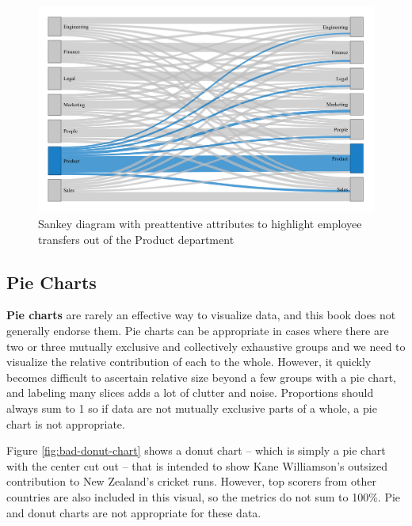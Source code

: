 \documentclass[
]{book}
\begin{document}
\begin{figure}

{\centering \includegraphics[width=1\linewidth]{graphics/sankey_4} 

}

\caption{Sankey diagram with preattentive attributes to highlight employee transfers out of the Product department}\label{fig:sankey-4}
\end{figure}

\hypertarget{pie-charts}{%
\subsection{Pie Charts}\label{pie-charts}}

\textbf{Pie charts} are rarely an effective way to visualize data, and this book does not generally endorse them. Pie charts can be appropriate in cases where there are two or three mutually exclusive and collectively exhaustive groups and we need to visualize the relative contribution of each to the whole. However, it quickly becomes difficult to ascertain relative size beyond a few groups with a pie chart, and labeling many slices adds a lot of clutter and noise. Proportions should always sum to 1 so if data are not mutually exclusive parts of a whole, a pie chart is not appropriate.

Figure \ref{fig:bad-donut-chart} shows a donut chart -- which is simply a pie chart with the center cut out -- that is intended to show Kane Williamson's outsized contribution to New Zealand's cricket runs. However, top scorers from other countries are also included in this visual, so the metrics do not sum to 100\%. Pie and donut charts are not appropriate for these data.
\end{document}
